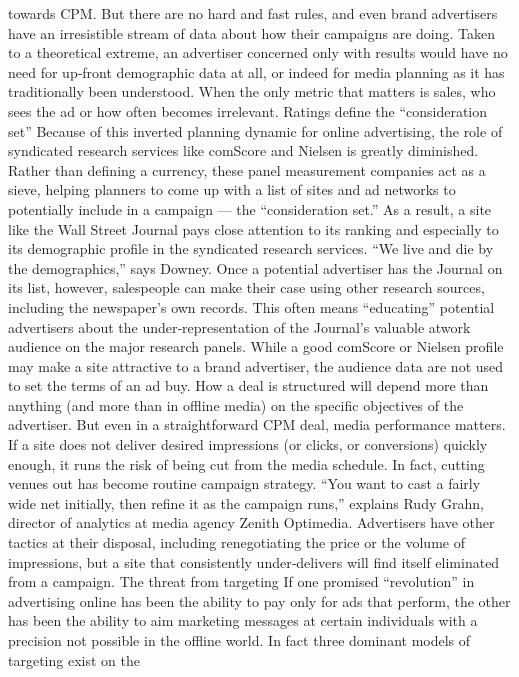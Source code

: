 towards CPM. But there are no hard and fast rules, and even brand
advertisers have an irresistible stream of data about how their campaigns
are doing. Taken to a theoretical extreme, an advertiser concerned only
with results would have no need for up‐front demographic data at all, or
indeed for media planning as it has traditionally been understood. When
the only metric that matters is sales, who sees the ad or how often
becomes irrelevant.
Ratings define the ``consideration set''
Because of this inverted planning dynamic for online advertising, the role
of syndicated research services like comScore and Nielsen is greatly
diminished. Rather than defining a currency, these panel measurement
companies act as a sieve, helping planners to come up with a list of sites
and ad networks to potentially include in a campaign — the
``consideration set.''
As a result, a site like the Wall Street Journal pays close attention to its
ranking and especially to its demographic profile in the syndicated
research services. ``We live and die by the demographics,'' says Downey.
Once a potential advertiser has the Journal on its list, however, salespeople
can make their case using other research sources, including the
newspaper’s own records. This often means ``educating'' potential
advertisers about the under‐representation of the Journal’s valuable atwork
audience on the major research panels.
While a good comScore or Nielsen profile may make a site attractive to a
brand advertiser, the audience data are not used to set the terms of an ad
buy. How a deal is structured will depend more than anything (and more
than in offline media) on the specific objectives of the advertiser. But even
in a straightforward CPM deal, media performance matters. If a site does
not deliver desired impressions (or clicks, or conversions) quickly enough,
it runs the risk of being cut from the media schedule.
In fact, cutting venues out has become routine campaign strategy. ``You
want to cast a fairly wide net initially, then refine it as the campaign
runs,'' explains Rudy Grahn, director of analytics at media agency Zenith
Optimedia. Advertisers have other tactics at their disposal, including
renegotiating the price or the volume of impressions, but a site that
consistently under‐delivers will find itself eliminated from a campaign.
The threat from targeting
If one promised ``revolution'' in advertising online has been the ability to
pay only for ads that perform, the other has been the ability to aim
marketing messages at certain individuals with a precision not possible in
the offline world. In fact three dominant models of targeting exist on the
